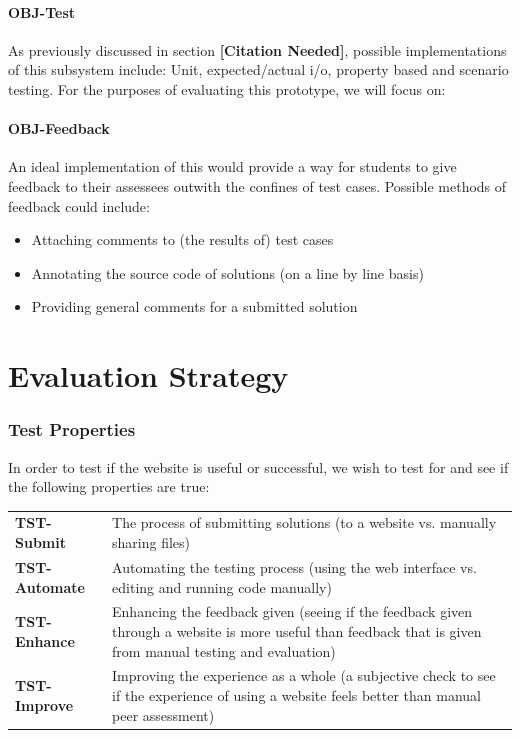\documentclass[a4paper,11pt]{report}
\newcommand{\cn}{\textbf{[Citation Needed]}}
\begin{document}
\subsubsection*{OBJ-Test}
As previously discussed in section \cn, possible implementations of this subsystem include: Unit, expected/actual i/o, property based and scenario testing. For the purposes of evaluating this prototype, we will focus on:
\subsubsection*{OBJ-Feedback}
An ideal implementation of this would provide a way for students to give feedback to their assessees outwith the confines of test cases. Possible methods of feedback could include:
\begin{itemize}
 \item Attaching comments to (the results of) test cases
 \item Annotating the source code of solutions (on a line by line basis)
 \item Providing general comments for a submitted solution
\end{itemize}


\chapter{Evaluation Strategy}

\subsection{Test Properties}
In order to test if the website is useful or successful, we wish to test for and see if the following properties are true:\\
\begin{tabularx}{\textwidth}{lX}
 \textbf{TST-Submit} & The process of submitting solutions (to a website vs. manually sharing files)\\
 \textbf{TST-Automate} & Automating the testing process (using the web interface vs. editing and running code manually)\\
 \textbf{TST-Enhance} & Enhancing the feedback given (seeing if the feedback given through a website is more useful than feedback that is given from manual testing and evaluation)\\
 \textbf{TST-Improve} & Improving the experience as a whole (a subjective check to see if the experience of using a website feels better than manual peer assessment)\\
\end{tabularx}
\end{document}
